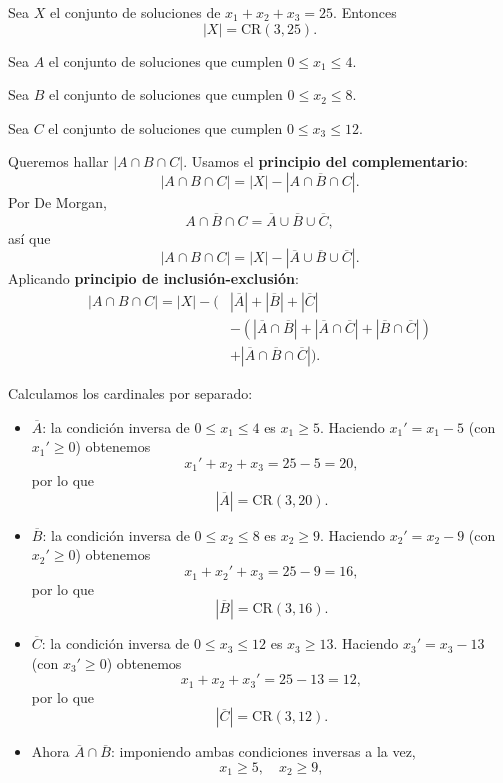 \documentclass[a4paper,12pt]{article}
\begin{document}
\begin{ejercicio}[title=Ejercicio 31]

Sea \(X\) el conjunto de soluciones de \(x_1+x_2+x_3=25\).
Entonces
\[
|X| = \mathrm{CR}(3,25).
\]

Sea \(A\) el conjunto de soluciones que cumplen \(0\le x_1\le 4\).

Sea \(B\) el conjunto de soluciones que cumplen \(0\le x_2\le 8\).

Sea \(C\) el conjunto de soluciones que cumplen \(0\le x_3\le 12\).

\vspace{0.5em}

Queremos hallar \(|A\cap B \cap C|\). Usamos el \textbf{principio del complementario}:
\[
|A\cap B \cap C| = |X| - |\overline{A\cap B \cap C}|.
\]
Por De Morgan,
\[
\overline{A\cap B \cap C}=\overline{A}\cup\overline{B}\cup\overline{C},
\]
así que
\[
|A\cap B \cap C| = |X| - |\overline{A}\cup\overline{B}\cup\overline{C}|.
\]
Aplicando \textbf{principio de inclusión-exclusión}:
\[
\begin{aligned}
|A\cap B \cap C| = |X| - \Big(&|\overline{A}| + |\overline{B}| + |\overline{C}| \\
&- (|\overline{A}\cap\overline{B}| + |\overline{A}\cap\overline{C}| + |\overline{B}\cap\overline{C}|) \\
&+ |\overline{A}\cap\overline{B}\cap\overline{C}|\Big).
\end{aligned}
\]

Calculamos los cardinales por separado:

\begin{itemize}

\item \(\overline{A}\): la condición inversa de \(0\le x_1\le 4\) es \(x_1\ge 5\).
Haciendo \(x_1' = x_1-5\) (con \(x_1'\ge 0\)) obtenemos
\[
x_1' + x_2 + x_3 = 25-5 = 20,
\]
por lo que
\[
|\overline{A}| = \mathrm{CR}(3,20).
\]

\item \(\overline{B}\): la condición inversa de \(0\le x_2\le 8\) es \(x_2\ge 9\).
Haciendo \(x_2' = x_2-9\) (con \(x_2'\ge 0\)) obtenemos
\[
x_1 + x_2' + x_3 = 25-9 = 16,
\]
por lo que
\[
|\overline{B}| = \mathrm{CR}(3,16).
\]

\item \(\overline{C}\): la condición inversa de \(0\le x_3\le 12\) es \(x_3\ge 13\).
Haciendo \(x_3' = x_3-13\) (con \(x_3'\ge 0\)) obtenemos
\[
x_1 + x_2 + x_3' = 25-13 = 12,
\]
por lo que
\[
|\overline{C}| = \mathrm{CR}(3,12).
\]

\item Ahora \(\overline{A}\cap\overline{B}\): imponiendo ambas condiciones inversas a la vez,
\[
x_1\ge 5,\quad x_2\ge 9,
\]
\end{itemize}
\end{ejercicio}
\end{document}
